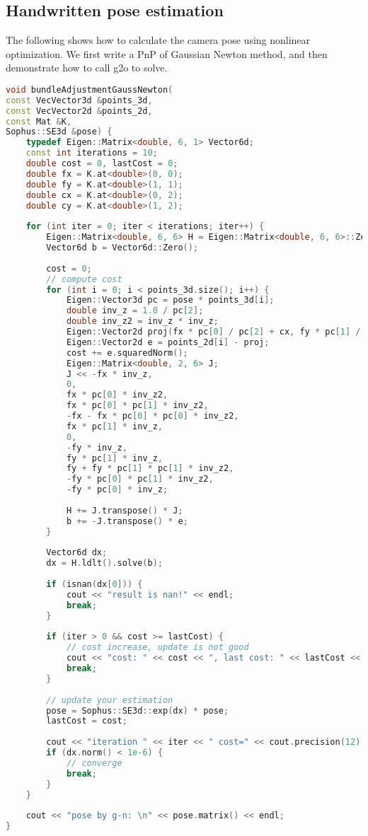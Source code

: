 \subsection{Handwritten pose estimation}
The following shows how to calculate the camera pose using nonlinear optimization. We first write a PnP of Gaussian Newton method, and then demonstrate how to call g2o to solve.
\begin{lstlisting}[language=c++,caption=slambook2/ch7/pose_estimation_3d2d.cpp（片段）]
void bundleAdjustmentGaussNewton(
const VecVector3d &points_3d,
const VecVector2d &points_2d,
const Mat &K,
Sophus::SE3d &pose) {
	typedef Eigen::Matrix<double, 6, 1> Vector6d;
	const int iterations = 10;
	double cost = 0, lastCost = 0;
	double fx = K.at<double>(0, 0);
	double fy = K.at<double>(1, 1);
	double cx = K.at<double>(0, 2);
	double cy = K.at<double>(1, 2);
	
	for (int iter = 0; iter < iterations; iter++) {
		Eigen::Matrix<double, 6, 6> H = Eigen::Matrix<double, 6, 6>::Zero();
		Vector6d b = Vector6d::Zero();
		
		cost = 0;
		// compute cost
		for (int i = 0; i < points_3d.size(); i++) {
			Eigen::Vector3d pc = pose * points_3d[i];
			double inv_z = 1.0 / pc[2];
			double inv_z2 = inv_z * inv_z;
			Eigen::Vector2d proj(fx * pc[0] / pc[2] + cx, fy * pc[1] / pc[2] + cy);
			Eigen::Vector2d e = points_2d[i] - proj;
			cost += e.squaredNorm();
			Eigen::Matrix<double, 2, 6> J;
			J << -fx * inv_z,
			0,
			fx * pc[0] * inv_z2,
			fx * pc[0] * pc[1] * inv_z2,
			-fx - fx * pc[0] * pc[0] * inv_z2,
			fx * pc[1] * inv_z,
			0,
			-fy * inv_z,
			fy * pc[1] * inv_z,
			fy + fy * pc[1] * pc[1] * inv_z2,
			-fy * pc[0] * pc[1] * inv_z2,
			-fy * pc[0] * inv_z;
			
			H += J.transpose() * J;
			b += -J.transpose() * e;
		}
		
		Vector6d dx;
		dx = H.ldlt().solve(b);
		
		if (isnan(dx[0])) {
			cout << "result is nan!" << endl;
			break;
		}
		
		if (iter > 0 && cost >= lastCost) {
			// cost increase, update is not good
			cout << "cost: " << cost << ", last cost: " << lastCost << endl;
			break;
		}
		
		// update your estimation
		pose = Sophus::SE3d::exp(dx) * pose;
		lastCost = cost;
		
		cout << "iteration " << iter << " cost=" << cout.precision(12) << cost << endl;
		if (dx.norm() < 1e-6) {
			// converge
			break;
		}
	}
	
	cout << "pose by g-n: \n" << pose.matrix() << endl;
}
\end{lstlisting}


